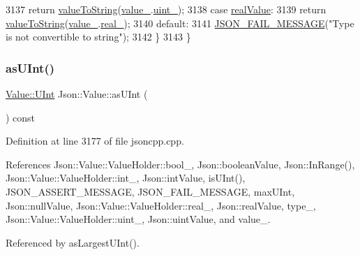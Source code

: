 \begin{DoxyCode}
3137     \textcolor{keywordflow}{return} \hyperlink{namespace_json_a498503e8f49d6a3811e3c9f6757da60d}{valueToString}(\hyperlink{class_json_1_1_value_aef578244546212705b9f81eb84d7e151}{value\_}.\hyperlink{union_json_1_1_value_1_1_value_holder_aab65665dc15a24a29a8e93cdeeaa7e50}{uint\_});
3138   \textcolor{keywordflow}{case} \hyperlink{namespace_json_a7d654b75c16a57007925868e38212b4eab837c7b869c14d8be712deb45c9e490e}{realValue}:
3139     \textcolor{keywordflow}{return} \hyperlink{namespace_json_a498503e8f49d6a3811e3c9f6757da60d}{valueToString}(\hyperlink{class_json_1_1_value_aef578244546212705b9f81eb84d7e151}{value\_}.\hyperlink{union_json_1_1_value_1_1_value_holder_af0c5ca724e5fe3a15db773d750e2351e}{real\_});
3140   \textcolor{keywordflow}{default}:
3141     \hyperlink{json_8h_a67007439f94bc6afc465923f56147ba1}{JSON\_FAIL\_MESSAGE}(\textcolor{stringliteral}{"Type is not convertible to string"});
3142   \}
3143 \}
\end{DoxyCode}
\mbox{\label{class_json_1_1_value_a74b305583ec3aacf4f9dd06e799dc265}} 
\subsubsection{\texorpdfstring{as\+U\+Int()}{asUInt()}}
{\footnotesize\ttfamily \hyperlink{class_json_1_1_value_a0933d59b45793ae4aade1757c322a98d}{Value\+::\+U\+Int} Json\+::\+Value\+::as\+U\+Int (\begin{DoxyParamCaption}{ }\end{DoxyParamCaption}) const}



Definition at line 3177 of file jsoncpp.\+cpp.



References Json\+::\+Value\+::\+Value\+Holder\+::bool\+\_\+, Json\+::boolean\+Value, Json\+::\+In\+Range(), Json\+::\+Value\+::\+Value\+Holder\+::int\+\_\+, Json\+::int\+Value, is\+U\+Int(), J\+S\+O\+N\+\_\+\+A\+S\+S\+E\+R\+T\+\_\+\+M\+E\+S\+S\+A\+GE, J\+S\+O\+N\+\_\+\+F\+A\+I\+L\+\_\+\+M\+E\+S\+S\+A\+GE, max\+U\+Int, Json\+::null\+Value, Json\+::\+Value\+::\+Value\+Holder\+::real\+\_\+, Json\+::real\+Value, type\+\_\+, Json\+::\+Value\+::\+Value\+Holder\+::uint\+\_\+, Json\+::uint\+Value, and value\+\_\+.



Referenced by as\+Largest\+U\+Int().


